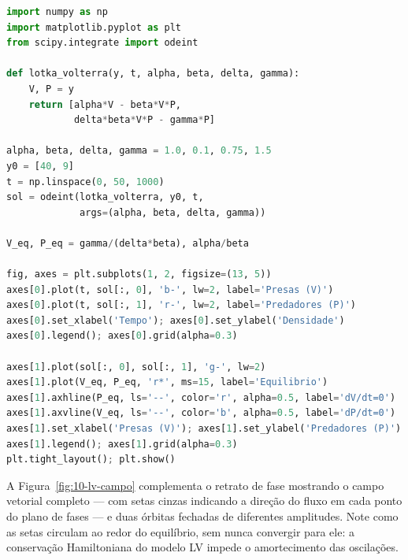 \begin{lstlisting}[language=Python, caption=Sistema predador-presa de Lotka-Volterra]
import numpy as np
import matplotlib.pyplot as plt
from scipy.integrate import odeint

def lotka_volterra(y, t, alpha, beta, delta, gamma):
    V, P = y
    return [alpha*V - beta*V*P,
            delta*beta*V*P - gamma*P]

alpha, beta, delta, gamma = 1.0, 0.1, 0.75, 1.5
y0 = [40, 9]
t = np.linspace(0, 50, 1000)
sol = odeint(lotka_volterra, y0, t,
             args=(alpha, beta, delta, gamma))

V_eq, P_eq = gamma/(delta*beta), alpha/beta

fig, axes = plt.subplots(1, 2, figsize=(13, 5))
axes[0].plot(t, sol[:, 0], 'b-', lw=2, label='Presas (V)')
axes[0].plot(t, sol[:, 1], 'r-', lw=2, label='Predadores (P)')
axes[0].set_xlabel('Tempo'); axes[0].set_ylabel('Densidade')
axes[0].legend(); axes[0].grid(alpha=0.3)

axes[1].plot(sol[:, 0], sol[:, 1], 'g-', lw=2)
axes[1].plot(V_eq, P_eq, 'r*', ms=15, label='Equilibrio')
axes[1].axhline(P_eq, ls='--', color='r', alpha=0.5, label='dV/dt=0')
axes[1].axvline(V_eq, ls='--', color='b', alpha=0.5, label='dP/dt=0')
axes[1].set_xlabel('Presas (V)'); axes[1].set_ylabel('Predadores (P)')
axes[1].legend(); axes[1].grid(alpha=0.3)
plt.tight_layout(); plt.show()
\end{lstlisting}

A Figura~\ref{fig:10-lv-campo} complementa o retrato de fase mostrando o
campo vetorial completo --- com setas cinzas indicando a direção do fluxo
em cada ponto do plano de fases --- e duas órbitas fechadas de diferentes
amplitudes. Note como as setas circulam ao redor do equilíbrio, sem nunca
convergir para ele: a conservação Hamiltoniana do modelo LV impede o
amortecimento das oscilações.

